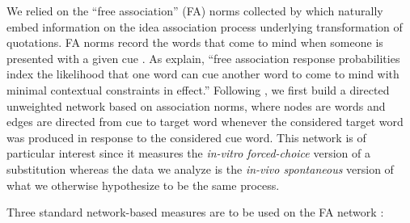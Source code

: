 \medskip
We relied on the ``free association'' (FA) norms collected by \citet{Nelson04} which naturally embed information on the idea association process underlying transformation of quotations. FA norms record the words that come to mind when someone is presented with a given cue%
. As \citet{Nelson04} explain, ``free association response probabilities index the likelihood that one word can cue another word to come to mind with minimal contextual constraints in effect.''
Following \citet{Griffiths07}, we first build a directed unweighted network based on association norms, where nodes are words and edges are directed from cue to target word whenever the considered target word was produced in response to the considered cue word.
This network is of particular interest since it measures the \emph{in-vitro forced-choice} version of a substitution whereas the data we analyze is the \emph{in-vivo spontaneous} version of what we otherwise hypothesize to be the same process.

Three standard network-based measures are to be used on the FA network%
:

